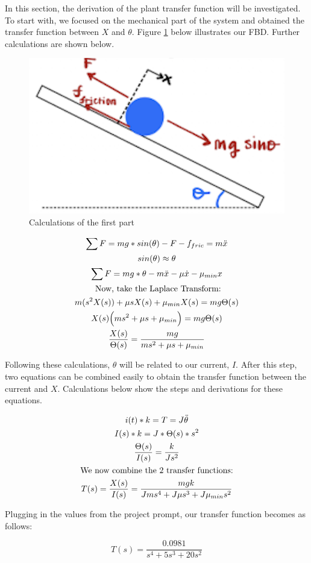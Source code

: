 In this section, the derivation of the plant transfer function will be investigated. To start with, we focused on the mechanical part of the system and obtained the transfer function between $X$ and $\theta$. Figure \ref{fig:mechanical_transfer} below illustrates our FBD. Further calculations are shown below. \\

\begin{figure}[H]
    \centering
    \includegraphics[width=.4\textwidth]{images/mechanical_transfer.png}
    \caption{Calculations of the first part}
    \label{fig:mechanical_transfer}
\end{figure}

\begin{gather*}
    \sum F = mg*sin(\theta) - F - f_{fric} = m\Ddot{x}\\
    sin(\theta) \approx \theta\\
    \sum F = mg*\theta - m\Ddot{x} - \mu\Dot{x} - \mu_{min}x \\
    \text{ Now, take the Laplace Transform:}\\
    m(s^2X(s)) + \mu sX(s) + \mu_{min}X(s) = mg\Theta(s)\\
    X(s)\Big(ms^2 + \mu s + \mu_{min}\Big) = mg\Theta(s)\\
    \frac{X(s)}{\Theta(s)} = \frac{mg}{ms^2 + \mu s + \mu_{min}}
\end{gather*}

Following these calculations, $\theta$ will be related to our current, $I$. After this step, two equations can be combined easily to obtain the transfer function between the current and $X$. Calculations below show the steps and derivations for these equations. 

\begin{gather*}
    i(t)*k = T = J\Ddot{\theta}\\
    I(s) * k = J*\Theta(s)* s^2\\
    \frac{\Theta(s)}{I(s)} = \frac{k}{Js^2}\\
    \text{We now combine the 2 transfer functions:}\\
    T(s) = \frac{X(s)}{I(s)} = \frac{mgk}{Jms^4 + J\mu s^3 + J\mu_{min} s^2}
\end{gather*}

Plugging in the values from the project prompt, our transfer function becomes as follows:

\begin{equation}
    T(s) = \frac{ 0.0981}{s^4 + 5 s^3 + 20 s^2}
\end{equation}